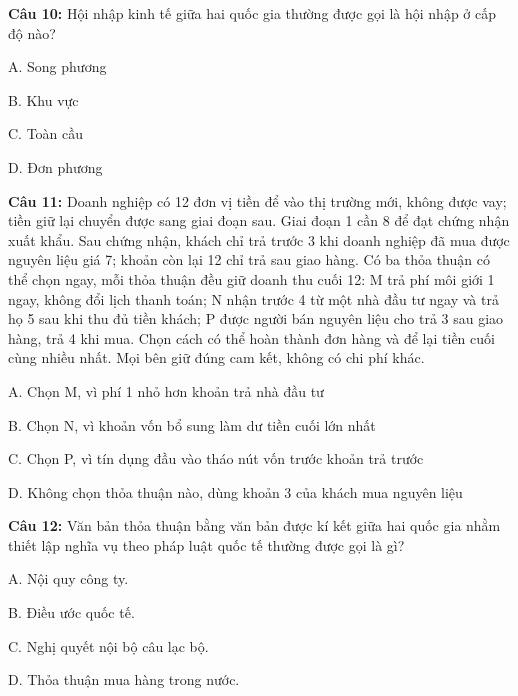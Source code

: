 \documentclass[12pt,a4paper]{article}
\begin{document}
\par\noindent\begin{minipage}{\linewidth}
\noindent\textbf{Câu 10:} Hội nhập kinh tế giữa hai quốc gia thường được gọi là hội nhập ở cấp độ nào?\par
\noindent A. Song phương\par
\noindent B. Khu vực\par
\noindent C. Toàn cầu\par
\noindent D. Đơn phương\par
\end{minipage}\par\vspace{0.12cm}

\par\noindent\begin{minipage}{\linewidth}
\noindent\textbf{Câu 11:} Doanh nghiệp có 12 đơn vị tiền để vào thị trường mới, không được vay; tiền giữ lại chuyển được sang giai đoạn sau. Giai đoạn 1 cần 8 để đạt chứng nhận xuất khẩu. Sau chứng nhận, khách chỉ trả trước 3 khi doanh nghiệp đã mua được nguyên liệu giá 7; khoản còn lại 12 chỉ trả sau giao hàng. Có ba thỏa thuận có thể chọn ngay, mỗi thỏa thuận đều giữ doanh thu cuối 12: M trả phí môi giới 1 ngay, không đổi lịch thanh toán; N nhận trước 4 từ một nhà đầu tư ngay và trả họ 5 sau khi thu đủ tiền khách; P được người bán nguyên liệu cho trả 3 sau giao hàng, trả 4 khi mua. Chọn cách có thể hoàn thành đơn hàng và để lại tiền cuối cùng nhiều nhất. Mọi bên giữ đúng cam kết, không có chi phí khác.\par
\noindent A. Chọn M, vì phí 1 nhỏ hơn khoản trả nhà đầu tư\par
\noindent B. Chọn N, vì khoản vốn bổ sung làm dư tiền cuối lớn nhất\par
\noindent C. Chọn P, vì tín dụng đầu vào tháo nút vốn trước khoản trả trước\par
\noindent D. Không chọn thỏa thuận nào, dùng khoản 3 của khách mua nguyên liệu\par
\end{minipage}\par\vspace{0.12cm}

\par\noindent\begin{minipage}{\linewidth}
\noindent\textbf{Câu 12:} Văn bản thỏa thuận bằng văn bản được kí kết giữa hai quốc gia nhằm thiết lập nghĩa vụ theo pháp luật quốc tế thường được gọi là gì?\par
\noindent A. Nội quy công ty.\par
\noindent B. Điều ước quốc tế.\par
\noindent C. Nghị quyết nội bộ câu lạc bộ.\par
\noindent D. Thỏa thuận mua hàng trong nước.\par
\end{minipage}\par\vspace{0.12cm}
\end{document}
